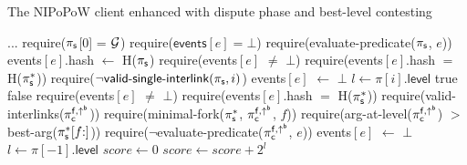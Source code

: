 \begin{algorithm}
    \caption{\label{alg:dispute-best-level}The \textsf{NIPoPoW} client enhanced
        with dispute phase and best-level contesting}

    \begin{algorithmic}[1]

    \State ...
        \State \textsf{require}($\mathsf{\pi_{s}}$[0] = $\mathcal{G}$)
        \State \textsf{require}($\textsf{events$[e]$} = \bot$)
        \State \textsf{require}(\textsf{evaluate-predicate}(\textsf{$\mathsf{\pi_{s}}$}, $e$))
        \State \textsf{events$[e]$.hash} $\gets$ \textsf{H}($\mathsf{\pi_{s}}$)
    \EndFunction
        \State \textsf{require}(\textsf{events}$[e]$ $\ne$ $\bot$)
        \State \textsf{require}(\textsf{events$[e]$.hash} $=$ \textsf{H}($\mathsf{\pi_{s}^*}$))
        \State \textsf{require}($\neg \textsf{valid-single-interlink}(\mathsf{\pi_{s}}, i)$)
        \State \textsf{events$[e]$} $\gets$ $\bot$
    \EndFunction
        \State $l\gets\pi[i].\mathsf{level}$
        \State \Return true
        \EndIf
        \State \Return false
    \EndFunction
        \State \textsf{require}(\textsf{events}$[e]$ $\ne$ $\bot$)
        \State \textsf{require}(\textsf{events$[e]$.hash} $=$ \textsf{H}($\mathsf{\pi_{s}^*}$))
        \State \textsf{require}(\textsf{valid-interlinks}($\mathsf{\pi_{c}^{f, \uparrow^{b}}}$))
        \State \textsf{require}(\textsf{minimal-fork}($\mathsf{\pi_{s}^*}$,
        $\mathsf{\pi_{c}^{f, \uparrow^{b}}}$, $f$))
        \State \textsf{require}(\textsf{arg-at-level}($\mathsf{\pi_{c}^{f, \uparrow^{b}}}$)
        $>$ \textsf{best-arg}($\mathsf{\pi_{s}^*}[f{:}]$))
        \State \textsf{require}(\textsf{$\neg$evaluate-predicate}($\mathsf{\pi_{c}^{f, \uparrow^{b}}}$, $e$))
        \State \textsf{events$[e]$} $\gets$ $\bot$
    \EndFunction
        \State $l \gets \pi[-1].\textsf{level}$
        \State $score \gets 0$
        \EndIf
            \State $score \gets score {+} 2^l$
        \EndFor
        \State {}
    \EndFunction
    \EndContract
    \vskip8pt
    \end{algorithmic}
\end{algorithm}

